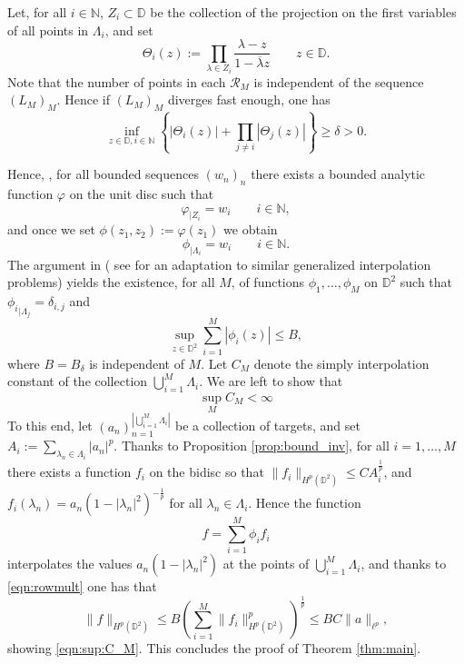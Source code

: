 \documentclass{amsart}
\numberwithin{equation}{section}
\newcommand{\D}{\mathbb{D}}
\newcommand{\N}{\mathbb{N}}
\newcommand{\quilt}{\mathcal{R}}
\begin{document}
 
Let, for all $i\in\N$, $Z_i\subset\D$ be the collection of the projection on the first variables of all points in $\Lambda_i$, and set 
\[
\Theta_i(z):=\prod_{\lambda\in Z_i}\frac{\lambda-z}{1-\overline{\lambda}z}\qquad z\in\D.
\]
Note that the number of points in each $\quilt_M$ is independent of the sequence $(L_M)_M$. Hence if $(L_M)_M$ diverges fast enough, one has
\[
\inf_{z\in\D, i\in\N}\left\{|\Theta_i(z)|+\prod_{j\ne i}|\Theta_j(z)|\right\}\ge\delta>0.
\]

Hence, \cite[Theorem 3.2.14]{Nikolski02}, for all bounded sequences $(w_n)_n$ there exists a bounded analytic function $\varphi$ on the unit disc such that 
\[
\varphi_{|Z_i}=w_i\qquad i\in\N,
\]
and once we set $\phi(z_1, z_2):=\varphi(z_1)$ we obtain
\[
\phi_{|\Lambda_i}=w_i\qquad i\in\N.
\]
The argument in \cite[Theorem 2.2, p. 288]{Garnett} ( see \cite[Theorem 4.1]{Dayan20} for an adaptation to similar generalized interpolation problems) yields the existence, for all $M$, of functions $\phi_1, \dots, \phi_M$ on $\D^2$ such that ${\phi_i}_{|\Lambda_j}=\delta_{i, j}$ and 
\begin{equation}
\label{eqn:rowmult}
\sup_{z\in\D^2}\sum_{i=1}^M|\phi_i(z)|\leq B,
\end{equation}
 where $B=B_\delta$ is independent of $M$. Let $C_M$ denote the simply interpolation constant of the collection $\bigcup_{i=1}^M\Lambda_i$. We are left to show that 
\begin{equation}
\label{eqn:sup:C_M}
\sup_M C_M<\infty
\end{equation}
To this end, let $(a_n)_{n=1}^{|\bigcup_{i=1}^M\Lambda_i|}$ be a collection of targets, and set $A_i:=\sum_{\lambda_n\in\Lambda_i}|a_n|^p$. Thanks to Proposition \ref{prop:bound_inv}, for all $i=1, \dots, M$ there exists a function $f_i$ on the bidisc so that $\|f_i\|_{H^p(\D^2)}\le C A_i^\frac{1}{p}$, and  $f_i(\lambda_n)=a_n(1-|\lambda_n|^2)^{-\frac{1}{p}}$ for all $\lambda_n\in\Lambda_i$. Hence the function 
\[
f=\sum_{i=1}^M \phi_if_i
\]
interpolates the values $a_n(1-|\lambda_n|^2)$ at the points of $\bigcup_{i=1}^M\Lambda_i$, and thanks to \eqref{eqn:rowmult} one has that 
\[
\|f\|_{H^p(\D^2)}\leq B\left(\sum_{i=1}^M\|f_i\|_{H^p(\D^2)}^p\right)^\frac{1}{p}\leq B C \|a\|_{\ell^p}, 
\]
showing \eqref{eqn:sup:C_M}.
This concludes the proof of Theorem \ref{thm:main}.
\end{document}
